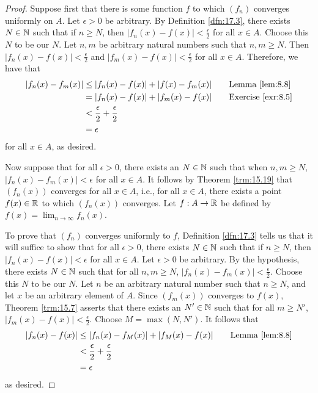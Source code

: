 \documentclass[../main.tex]{subfiles}
\begin{document}
\begin{theorem}
\begin{proof}
        Suppose first that there is some function $f$ to which $(f_n)$ converges uniformly on $A$. Let $\epsilon>0$ be arbitrary. By Definition \ref{dfn:17.3}, there exists $N\in\mathbb{N}$ such that if $n\geq N$, then $|f_n(x)-f(x)|<\frac{\epsilon}{2}$ for all $x\in A$. Choose this $N$ to be our $N$. Let $n,m$ be arbitrary natural numbers such that $n,m\geq N$. Then $|f_n(x)-f(x)|<\frac{\epsilon}{2}$ and $|f_m(x)-f(x)|<\frac{\epsilon}{2}$ for all $x\in A$. Therefore, we have that
        \begin{align*}
            |f_n(x)-f_m(x)| &\leq |f_n(x)-f(x)|+|f(x)-f_m(x)|\tag*{Lemma \ref{lem:8.8}}\\
            &= |f_n(x)-f(x)|+|f_m(x)-f(x)|\tag*{Exercise \ref{exr:8.5}}\\
            &< \frac{\epsilon}{2}+\frac{\epsilon}{2}\\
            &= \epsilon
        \end{align*}
        for all $x\in A$, as desired.\par\smallskip
        Now suppose that for all $\epsilon>0$, there exists an $N\in\mathbb{N}$ such that when $n,m\geq N$, $|f_n(x)-f_m(x)|<\epsilon$ for all $x\in A$. It follows by Theorem \ref{trm:15.19} that $(f_n(x))$ converges for all $x\in A$, i.e., for all $x\in A$, there exists a point $f(x)\in\mathbb{R}$ to which $(f_n(x))$ converges. Let $f:A\to\mathbb{R}$ be defined by $f(x)=\lim_{n\to\infty}f_n(x)$.\par
        To prove that $(f_n)$ converges uniformly to $f$, Definition \ref{dfn:17.3} tells us that it will suffice to show that for all $\epsilon>0$, there exists $N\in\mathbb{N}$ such that if $n\geq N$, then $|f_n(x)-f(x)|<\epsilon$ for all $x\in A$. Let $\epsilon>0$ be arbitrary. By the hypothesis, there exists $N\in\mathbb{N}$ such that for all $n,m\geq N$, $|f_n(x)-f_m(x)|<\frac{\epsilon}{2}$. Choose this $N$ to be our $N$. Let $n$ be an arbitrary natural number such that $n\geq N$, and let $x$ be an arbitrary element of $A$. Since $(f_m(x))$ converges to $f(x)$, Theorem \ref{trm:15.7} asserts that there exists an $N'\in\mathbb{N}$ such that for all $m\geq N'$, $|f_m(x)-f(x)|<\frac{\epsilon}{2}$. Choose $M=\max(N,N')$. It follows that
        \begin{align*}
            |f_n(x)-f(x)| &\leq |f_n(x)-f_M(x)|+|f_M(x)-f(x)|\tag*{Lemma \ref{lem:8.8}}\\
            &< \frac{\epsilon}{2}+\frac{\epsilon}{2}\\
            &= \epsilon
        \end{align*}
        as desired.
    \end{proof}
\end{theorem}
\end{document}
